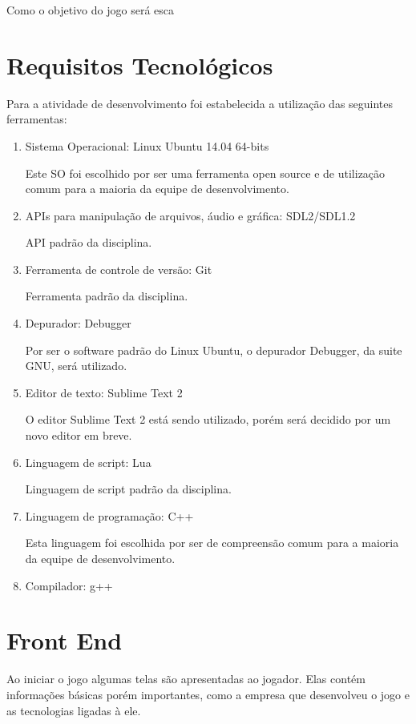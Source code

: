 \documentclass[12pt]{article}
\begin{document}
Como o objetivo do jogo será esca
\section{Requisitos Tecnológicos}
Para a atividade de desenvolvimento foi estabelecida a utilização das seguintes ferramentas:

\begin{enumerate}
\item Sistema Operacional: Linux Ubuntu 14.04 64-bits

Este SO foi escolhido por ser uma ferramenta open source e de utilização comum para a maioria da equipe de desenvolvimento.

\item APIs para manipulação de arquivos, áudio e gráfica: SDL2/SDL1.2

API padrão da disciplina.

\item Ferramenta de controle de versão: Git

Ferramenta padrão da disciplina.

\item Depurador: Debugger

Por ser o software padrão do Linux Ubuntu, o depurador Debugger, da suite GNU, será utilizado.

\item Editor de texto: Sublime Text 2 

O editor Sublime Text 2 está sendo utilizado, porém será decidido por um novo editor em breve.

\item Linguagem de script: Lua

Linguagem de script padrão da disciplina.

\item Linguagem de programação: C++

Esta linguagem foi escolhida por ser de compreensão comum para a maioria da equipe de desenvolvimento.

\item Compilador: g++

\end{enumerate}

\section{Front End}
Ao iniciar o jogo algumas telas são apresentadas ao jogador. Elas contém informações básicas porém importantes, como a empresa que desenvolveu o jogo e as tecnologias ligadas à ele. 
\end{document}
